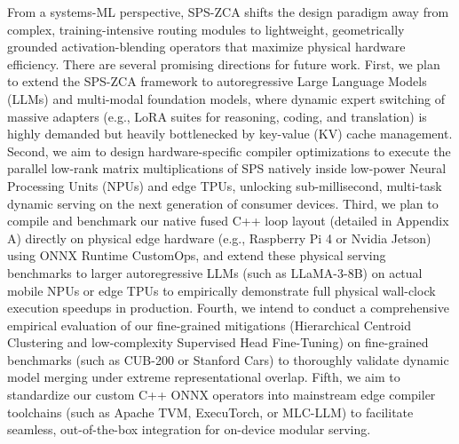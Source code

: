 From a systems-ML perspective, SPS-ZCA shifts the design paradigm away from complex, training-intensive routing modules to lightweight, geometrically grounded activation-blending operators that maximize physical hardware efficiency. 
There are several promising directions for future work. First, we plan to extend the SPS-ZCA framework to autoregressive Large Language Models (LLMs) and multi-modal foundation models, where dynamic expert switching of massive adapters (e.g., LoRA suites for reasoning, coding, and translation) is highly demanded but heavily bottlenecked by key-value (KV) cache management. Second, we aim to design hardware-specific compiler optimizations to execute the parallel low-rank matrix multiplications of SPS natively inside low-power Neural Processing Units (NPUs) and edge TPUs, unlocking sub-millisecond, multi-task dynamic serving on the next generation of consumer devices. Third, we plan to compile and benchmark our native fused C++ loop layout (detailed in Appendix A) directly on physical edge hardware (e.g., Raspberry Pi 4 or Nvidia Jetson) using ONNX Runtime CustomOps, and extend these physical serving benchmarks to larger autoregressive LLMs (such as LLaMA-3-8B) on actual mobile NPUs or edge TPUs to empirically demonstrate full physical wall-clock execution speedups in production. Fourth, we intend to conduct a comprehensive empirical evaluation of our fine-grained mitigations (Hierarchical Centroid Clustering and low-complexity Supervised Head Fine-Tuning) on fine-grained benchmarks (such as CUB-200 or Stanford Cars) to thoroughly validate dynamic model merging under extreme representational overlap. Fifth, we aim to standardize our custom C++ ONNX operators into mainstream edge compiler toolchains (such as Apache TVM, ExecuTorch, or MLC-LLM) to facilitate seamless, out-of-the-box integration for on-device modular serving.
